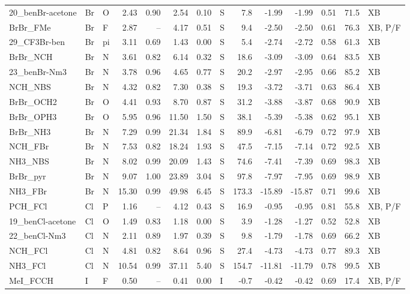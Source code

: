 {\begin{longtable}{lllrrrrlrrrrrl}
20\_benBr-acetone & Br & O & 2.43 & 0.90 & 2.54 & 0.10 & S & 7.8 & -1.99 & -1.99 & 0.51 & 71.5 & XB\\
BrBr\_FMe & Br & F & 2.87 & -- & 4.17 & 0.51 & S & 9.4 & -2.50 & -2.50 & 0.61 & 76.3 & XB, P/F\\
29\_CF3Br-ben & Br & pi & 3.11 & 0.69 & 1.43 & 0.00 & S & 5.4 & -2.74 & -2.72 & 0.58 & 61.3 & XB\\
BrBr\_NCH & Br & N & 3.61 & 0.82 & 6.14 & 0.32 & S & 18.6 & -3.09 & -3.09 & 0.64 & 83.5 & XB\\
23\_benBr-Nm3 & Br & N & 3.78 & 0.96 & 4.65 & 0.77 & S & 20.2 & -2.97 & -2.95 & 0.66 & 85.2 & XB\\
NCH\_NBS & Br & N & 4.32 & 0.82 & 7.30 & 0.38 & S & 19.3 & -3.72 & -3.71 & 0.63 & 86.4 & XB\\
BrBr\_OCH2 & Br & O & 4.41 & 0.93 & 8.70 & 0.87 & S & 31.2 & -3.88 & -3.87 & 0.68 & 90.9 & XB\\
BrBr\_OPH3 & Br & O & 5.95 & 0.96 & 11.50 & 1.50 & S & 38.1 & -5.39 & -5.38 & 0.62 & 95.1 & XB\\
BrBr\_NH3 & Br & N & 7.29 & 0.99 & 21.34 & 1.84 & S & 89.9 & -6.81 & -6.79 & 0.72 & 97.9 & XB\\
NCH\_FBr & Br & N & 7.53 & 0.82 & 18.24 & 1.93 & S & 47.5 & -7.15 & -7.14 & 0.72 & 92.5 & XB\\
NH3\_NBS & Br & N & 8.02 & 0.99 & 20.09 & 1.43 & S & 74.6 & -7.41 & -7.39 & 0.69 & 98.3 & XB\\
BrBr\_pyr & Br & N & 9.07 & 1.00 & 23.89 & 3.04 & S & 97.8 & -7.97 & -7.95 & 0.69 & 98.9 & XB\\
NH3\_FBr & Br & N & 15.30 & 0.99 & 49.98 & 6.45 & S & 173.3 & -15.89 & -15.87 & 0.71 & 99.6 & XB\\
PCH\_FCl & Cl & P & 1.16 & -- & 4.12 & 0.43 & S & 16.9 & -0.95 & -0.95 & 0.81 & 55.8 & XB, P/F\\
19\_benCl-acetone & Cl & O & 1.49 & 0.83 & 1.18 & 0.00 & S & 3.9 & -1.28 & -1.27 & 0.52 & 52.8 & XB\\
22\_benCl-Nm3 & Cl & N & 2.11 & 0.89 & 1.97 & 0.39 & S & 9.8 & -1.79 & -1.78 & 0.69 & 66.2 & XB\\
NCH\_FCl & Cl & N & 4.81 & 0.82 & 8.64 & 0.96 & S & 27.4 & -4.73 & -4.73 & 0.77 & 89.3 & XB\\
NH3\_FCl & Cl & N & 10.54 & 0.99 & 37.11 & 5.40 & S & 154.7 & -11.81 & -11.79 & 0.78 & 99.5 & XB\\
MeI\_FCCH & I & F & 0.50 & -- & 0.41 & 0.00 & I & -0.7 & -0.42 & -0.42 & 0.69 & 17.4 & XB, P/F\\

\end{longtable}}
